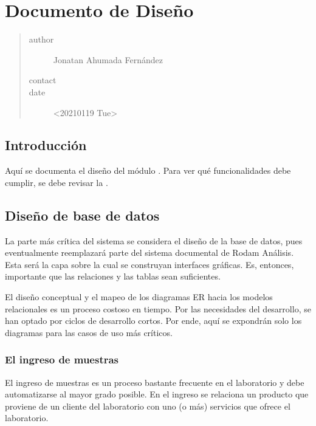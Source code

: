 \documentclass[letterpaper,10pt,spanish]{sphinxmanual}
\begin{document}
\chapter{Documento de Diseño}
\label{\detokenize{requerimientos/SDD:documento-de-diseno}}\label{\detokenize{requerimientos/SDD::doc}}\begin{quote}\begin{description}
\item[{author}] \leavevmode
Jonatan Ahumada Fernández

\item[{contact}] \leavevmode
{}

\item[{date}] \leavevmode
\textless{}2021\sphinxhyphen{}01\sphinxhyphen{}19 Tue\textgreater{}

\end{description}\end{quote}


\section{Introducción}
\label{\detokenize{requerimientos/SDD:introduccion}}
Aquí se documenta el diseño del módulo .  Para ver qué
funcionalidades debe cumplir, se debe revisar la .


\section{Diseño de base de datos}
\label{\detokenize{requerimientos/SDD:diseno-de-base-de-datos}}
La parte más crítica del sistema se considera el diseño de la base de
datos, pues eventualmente reemplazará parte del sistema documental de
Rodam Análisis. Esta será la capa sobre la cual se construyan
interfaces gráficas. Es, entonces, importante que las relaciones y las
tablas sean suficientes.

El diseño conceptual y el mapeo de los diagramas ER hacia los modelos
relacionales es un proceso costoso en tiempo. Por las necesidades del
desarrollo, se han optado por ciclos de desarrollo cortos. Por ende,
aquí se expondrán solo los diagramas para las casos de uso más críticos.


\subsection{El ingreso de muestras}
\label{\detokenize{requerimientos/SDD:el-ingreso-de-muestras}}
El ingreso de muestras es un proceso bastante frecuente en el laboratorio y
debe automatizarse al mayor grado posible. En el ingreso se relaciona un
producto que proviene de un cliente del laboratorio con uno (o más) servicios
que ofrece el laboratorio.
\end{document}
